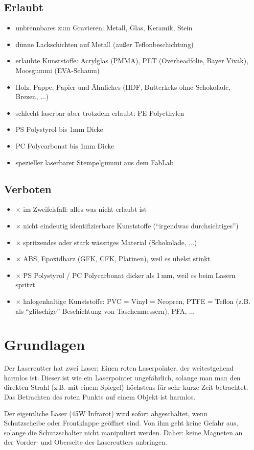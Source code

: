 \documentclass{\basedir/fablab-document}
\begin{document}
\subsection{Erlaubt}
\newcommand{\itemCheck}{\item[\checkmark]}
\begin{itemize}
\itemCheck unbrennbares zum Gravieren: Metall, Glas, Keramik, Stein
\itemCheck dünne Lackschichten auf Metall (außer Teflonbeschichtung)
\itemCheck erlaubte Kunststoffe: Acrylglas (PMMA), PET (Overheadfolie, Bayer Vivak), Moosgummi (EVA-Schaum)
\itemCheck Holz, Pappe, Papier und Ähnliches (HDF, Butterkeks ohne Schokolade, Brezen, ...)
\itemCheck schlecht laserbar aber trotzdem erlaubt: PE Polyethylen
\itemCheck PS Polystyrol bis 1mm Dicke
\itemCheck PC Polycarbonat bis 1mm Dicke
\itemCheck spezieller laserbarer Stempelgummi aus dem FabLab
\end{itemize}

\subsection{Verboten}
\newcommand{\itemCross}{\item[$\times$]}
\begin{itemize}
\itemCross im Zweifelsfall: alles was nicht erlaubt ist
\itemCross nicht eindeutig identifizierbare Kunststoffe (\enquote{irgendwas durchsichtiges})
\itemCross spritzendes oder stark wässriges Material (Schokolade, ...)
\itemCross ABS, Epoxidharz (GFK, CFK, Platinen), weil es übelst stinkt
\itemCross PS Polystyrol / PC Polycarbonat dicker als 1\,mm, weil es beim Lasern spritzt
\itemCross halogenhaltige Kunststoffe: PVC = Vinyl = Neopren, PTFE = Teflon (z.B. als \enquote{glitschige} Beschichtung von Taschenmessern), PFA, ...
\end{itemize}

\section{Grundlagen}
Der Lasercutter hat zwei Laser: Einen roten Laserpointer, der weitestgehend harmlos ist. Dieser ist wie ein Laserpointer ungefährlich, solange man man den direkten Strahl (z.B. mit einem Spiegel) höchstens für sehr kurze Zeit betrachtet. Das Betrachten des roten Punkts auf einem Objekt ist harmlos.

Der eigentliche Laser (45W Infrarot) wird sofort abgeschaltet, wenn Schutzscheibe oder Frontklappe geöffnet sind. Von ihm geht keine Gefahr aus, solange die Schutzschalter nicht manipuliert werden. Daher: keine Magneten an der Vorder- und Oberseite des Lasercutters anbringen.
\end{document}
